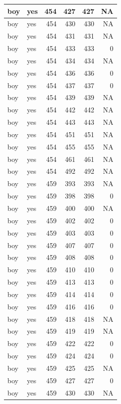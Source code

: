 \documentclass[man]{apa6}
\begin{document}
\begin{tabular}{l|l|r|r|r|r}
\hline
boy & yes & 454 & 427 & 427 & NA\\
\hline
boy & yes & 454 & 430 & 430 & NA\\
\hline
boy & yes & 454 & 431 & 431 & NA\\
\hline
boy & yes & 454 & 433 & 433 & 0\\
\hline
boy & yes & 454 & 434 & 434 & NA\\
\hline
boy & yes & 454 & 436 & 436 & 0\\
\hline
boy & yes & 454 & 437 & 437 & 0\\
\hline
boy & yes & 454 & 439 & 439 & NA\\
\hline
boy & yes & 454 & 442 & 442 & NA\\
\hline
boy & yes & 454 & 443 & 443 & NA\\
\hline
boy & yes & 454 & 451 & 451 & NA\\
\hline
boy & yes & 454 & 455 & 455 & NA\\
\hline
boy & yes & 454 & 461 & 461 & NA\\
\hline
boy & yes & 454 & 492 & 492 & NA\\
\hline
boy & yes & 459 & 393 & 393 & NA\\
\hline
boy & yes & 459 & 398 & 398 & 0\\
\hline
boy & yes & 459 & 400 & 400 & NA\\
\hline
boy & yes & 459 & 402 & 402 & 0\\
\hline
boy & yes & 459 & 403 & 403 & 0\\
\hline
boy & yes & 459 & 407 & 407 & 0\\
\hline
boy & yes & 459 & 408 & 408 & 0\\
\hline
boy & yes & 459 & 410 & 410 & 0\\
\hline
boy & yes & 459 & 413 & 413 & 0\\
\hline
boy & yes & 459 & 414 & 414 & 0\\
\hline
boy & yes & 459 & 416 & 416 & 0\\
\hline
boy & yes & 459 & 418 & 418 & NA\\
\hline
boy & yes & 459 & 419 & 419 & NA\\
\hline
boy & yes & 459 & 422 & 422 & 0\\
\hline
boy & yes & 459 & 424 & 424 & 0\\
\hline
boy & yes & 459 & 425 & 425 & NA\\
\hline
boy & yes & 459 & 427 & 427 & 0\\
\hline
boy & yes & 459 & 430 & 430 & NA\\

\end{tabular}
\end{document}

